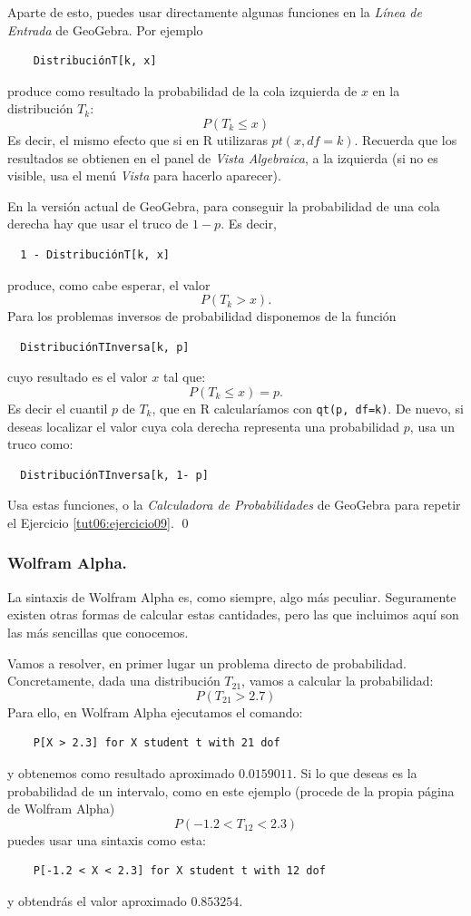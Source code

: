 \documentclass[10pt,a4paper]{article}\usepackage[]{graphicx}\usepackage[]{color}
\begin{document}
Aparte de esto, puedes usar directamente algunas funciones en la {\em Línea de Entrada} de GeoGebra. Por ejemplo
\begin{verbatim}
    DistribuciónT[k, x]
\end{verbatim}
produce como resultado la probabilidad de la cola izquierda de $x$ en la distribución $T_k$:
\[P(T_k \leq x)\]
Es decir, el mismo efecto que si en R utilizaras $pt(x, df=k)$. Recuerda que los resultados se obtienen en el panel de {\em Vista Algebraica}, a la izquierda (si no es visible, usa el menú {\em Vista} para hacerlo aparecer).


En la versión actual de GeoGebra, para conseguir la probabilidad de una cola derecha hay que usar el truco de $1-p$. Es decir,
\begin{verbatim}
  1 - DistribuciónT[k, x]
\end{verbatim}
produce, como cabe esperar, el valor
\[P(T_k > x).\]
Para los problemas inversos de probabilidad disponemos de la función
\begin{verbatim}
  DistribuciónTInversa[k, p]
\end{verbatim}
cuyo resultado es el valor $x$ tal que:
\[P(T_k \leq x) = p.\]
Es decir el cuantil $p$ de $T_k$, que en R calcularíamos con {\tt qt(p, df=k)}. De nuevo, si deseas localizar el valor cuya cola derecha  representa una probabilidad $p$, usa un truco como:
\begin{verbatim}
  DistribuciónTInversa[k, 1- p]
\end{verbatim}

\begin{ejercicio}
\label{tut06:ejercicio10}
Usa estas funciones, o la {\em Calculadora de Probabilidades} de GeoGebra para repetir el Ejercicio \ref{tut06:ejercicio09}.
\qed
\end{ejercicio}

\subsubsection{Wolfram Alpha.}

La sintaxis de Wolfram Alpha es, como siempre, algo más peculiar. Seguramente existen otras formas de calcular estas cantidades, pero las que incluimos aquí son las más sencillas que conocemos.

Vamos a resolver, en primer lugar un problema directo de probabilidad. Concretamente, dada una distribución $T_{21}$, vamos a calcular la probabilidad:
\[P(T_{21}>2.7)\]
Para ello, en Wolfram Alpha ejecutamos el comando:
\begin{verbatim}
    P[X > 2.3] for X student t with 21 dof
\end{verbatim}
y obtenemos como resultado aproximado $0.0159011$. Si lo que deseas es la probabilidad de un intervalo, como en este ejemplo (procede de la propia página de Wolfram Alpha)
\[P(-1.2 < T_{12} < 2.3)\]
puedes usar una sintaxis como esta:
\begin{center}
\begin{verbatim}
    P[-1.2 < X < 2.3] for X student t with 12 dof
\end{verbatim}
\end{center}
y obtendrás el valor aproximado $0.853254$.
\end{document}
